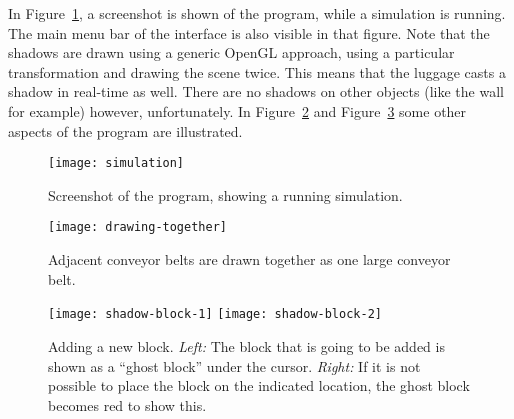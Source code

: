 In Figure~\ref{fig:simulation}, a screenshot is shown of the program, while a simulation is running. The main menu bar of the interface is also visible in that figure. Note that the shadows are drawn using a generic OpenGL approach, using a particular transformation and drawing the scene twice. This means that the luggage casts a shadow in real-time as well. There are no shadows on other objects (like the wall for example) however, unfortunately. In Figure~\ref{fig:drawing-together} and Figure~\ref{fig:shadow-block} some other aspects of the program are illustrated.

\begin{figure}
  \begin{center}
    \texttt{[image: simulation]}
    \caption{Screenshot of the program, showing a running simulation.}
    \label{fig:simulation}
  \end{center}
\end{figure}

\begin{figure}
  \begin{center}
    \texttt{[image: drawing-together]}
    \caption{Adjacent conveyor belts are drawn together as one large conveyor belt.}
    \label{fig:drawing-together}
  \end{center}
\end{figure}

\begin{figure}
  \begin{center}
    \texttt{[image: shadow-block-1]}
    \quad
    \texttt{[image: shadow-block-2]}
    \caption{Adding a new block. \textit{Left:} The block that is going to be added is shown as a ``ghost block'' under the cursor. \textit{Right:} If it is not possible to place the block on the indicated location, the ghost block becomes red to show this.}
    \label{fig:shadow-block}
  \end{center}
\end{figure}

